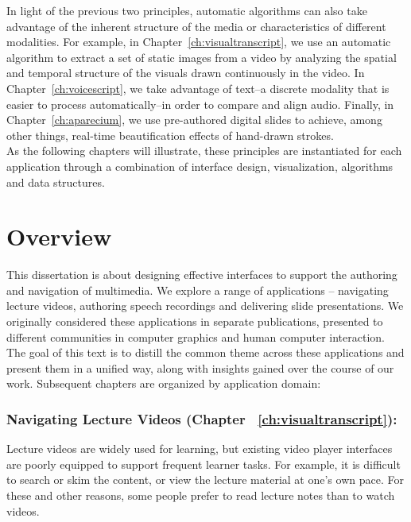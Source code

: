 In light of the previous two principles, automatic algorithms can also take advantage of the inherent structure of the media or characteristics of different modalities. For example, in Chapter~\ref{ch:visualtranscript}, we use an automatic algorithm to extract  a set of static images from a video by analyzing the spatial and temporal structure of the visuals drawn continuously in the video. In Chapter~\ref{ch:voicescript}, we take advantage of text--a discrete modality that is easier to process automatically--in order to compare and align audio. Finally, in Chapter~\ref{ch:aparecium}, we use pre-authored digital slides to achieve, among other things, real-time beautification effects of hand-drawn strokes.\\ 

As the following chapters will illustrate, these principles are instantiated for each application through a combination of interface design, visualization, algorithms and data structures.

\section{Overview}
This dissertation is about designing effective interfaces to support the authoring and navigation of multimedia. We explore a range of applications -- navigating lecture videos, authoring speech recordings and delivering slide presentations. We originally considered these applications in separate publications, presented to different communities in computer graphics and human computer interaction. The goal of this text is to distill the common theme across these applications and present them in a unified way, along with insights gained over the course of our work. Subsequent chapters are organized by application domain:\\


\subsubsection*{Navigating Lecture Videos (Chapter ~\ref{ch:visualtranscript}):}
Lecture videos are widely used for learning, but existing
video player interfaces are poorly equipped to support frequent learner tasks. For example, it is difficult to search or skim the content, or view the lecture material at one's own pace. For these and other reasons, some people prefer to read lecture notes than to watch videos.\\

